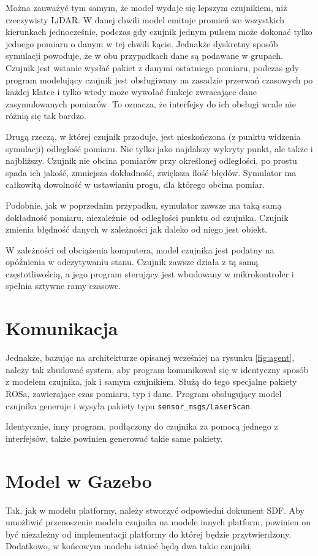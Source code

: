 	Można zauważyć tym samym, że model wydaje się lepszym czujnikiem, niż rzeczywisty LiDAR.
	W danej chwili model emituje promień we wszystkich kierunkach jednocześnie, podczas gdy czujnik jednym pulsem może dokonać tylko jednego pomiaru o danym w tej chwili kącie.
	Jednakże dyskretny sposób symulacji powoduje, że w obu przypadkach dane są podawane w grupach.
	Czujnik jest wstanie wysłać pakiet z danymi ostatniego pomiaru, podczas gdy program modelujący czujnik jest obsługiwany na zasadzie przerwań czasowych 
	po każdej klatce i tylko wtedy może wywołać funkcje zwracające dane zasymulowanych pomiarów.
	To oznacza, że interfejsy do ich obsługi wcale nie różnią się tak bardzo.

	Drugą rzeczą, w której czujnik przoduje, jest nieskończona (z punktu widzenia symulacji) odległość pomiaru.
	Nie tylko jako najdalszy wykryty punkt, ale także i najbliższy. 
	Czujnik nie obcina pomiarów przy określonej odległości, po prostu spada ich jakość, zmniejsza dokładność, zwiększa ilość błędów.
	Symulator ma całkowitą dowolność w ustawianiu progu, dla którego obcina pomiar.

	Podobnie, jak w poprzednim przypadku, symulator zawsze ma taką samą dokładność pomiaru, niezależnie od odległości punktu od czujnika.
	Czujnik zmienia błędność danych w zależności jak daleko od niego jest obiekt.

	W zależności od obciążenia komputera, model czujnika jest podatny na opóźnienia w odczytywaniu stanu.
	Czujnik zawsze działa z tą samą częstotliwością, a jego program sterujący jest wbudowany w mikrokontroler i spełnia sztywne ramy czasowe.

\section{Komunikacja}
	Jednakże, bazując na architekturze opisanej wcześniej na rysunku \ref{fig:agent}, należy tak zbudować system, aby program komunikował się w identyczny sposób z 
	modelem czujnika, jak i samym czujnikiem.
	Służą do tego specjalne pakiety ROSa, zawierające czas pomiaru, typ i dane.
	Program obsługujący model czujnika generuje i wysyła pakiety typu \texttt{sensor\_msgs/LaserScan}.

	Identycznie, inny program, podłączony do czujnika za pomocą jednego z interfejsów, także powinien generować takie same pakiety.

\section{Model w Gazebo}
	Tak, jak w modelu platformy, należy stworzyć odpowiedni dokument SDF. 
	Aby umożliwić przenoszenie modelu czujnika na modele innych platform, powinien on być niezależny od implementacji platformy do której będzie przytwierdzony.
	Dodatkowo, w końcowym modelu istnieć będą dwa takie czujniki.

